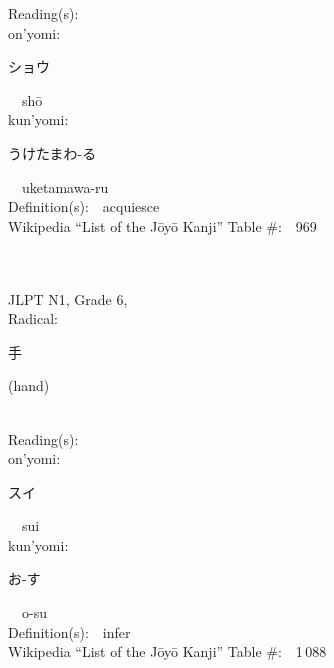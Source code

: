 \begin{multicols}{2}
Reading(s):\ \ \\
{\hspace*{1em}}on'yomi:\ \ \\
{\hspace*{2em}}{\begin{CJK}{UTF8}{min} ショウ \end{CJK}}\ \ sh\=o\ \ \\
{\hspace*{1em}}kun'yomi:\ \ \\
{\hspace*{2em}}{\begin{CJK}{UTF8}{min} うけたまわ-る \end{CJK}}\ \ uketamawa-ru\ \ \\
Definition(s):\ \ acquiesce \\
Wikipedia ``List of the J\=oy\=o Kanji'' Table \#:\ \ 969 \\
\ \ \\
{\fontsize{34pt}{40pt}  }\ \ \\  %
{JLPT N1, Grade 6, \\Radical:\ \ {\begin{CJK}{UTF8}{min} 手 \end{CJK}} (hand) } \\
Reading(s):\ \ \\
{\hspace*{1em}}on'yomi:\ \ \\
{\hspace*{2em}}{\begin{CJK}{UTF8}{min} スイ \end{CJK}}\ \ sui\ \ \\
{\hspace*{1em}}kun'yomi:\ \ \\
{\hspace*{2em}}{\begin{CJK}{UTF8}{min} お-す \end{CJK}}\ \ o-su\ \ \\
Definition(s):\ \ infer \\
Wikipedia ``List of the J\=oy\=o Kanji'' Table \#:\ \ 1\,088 \\
\ \ \\
{\fontsize{34pt}{40pt}  }\ \ \\  %

\end{multicols}
